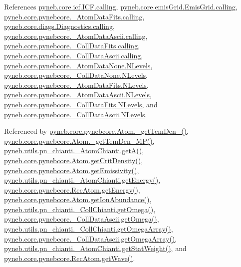 References \hyperlink{icf_8py_source_l00016}{pyneb.\+core.\+icf.\+I\+C\+F.\+calling}, \hyperlink{emis_grid_8py_source_l00041}{pyneb.\+core.\+emis\+Grid.\+Emis\+Grid.\+calling}, \hyperlink{pynebcore_8py_source_l00090}{pyneb.\+core.\+pynebcore.\+\_\+\+Atom\+Data\+Fits.\+calling}, \hyperlink{diags_8py_source_l00169}{pyneb.\+core.\+diags.\+Diagnostics.\+calling}, \hyperlink{pynebcore_8py_source_l00311}{pyneb.\+core.\+pynebcore.\+\_\+\+Atom\+Data\+Ascii.\+calling}, \hyperlink{pynebcore_8py_source_l00568}{pyneb.\+core.\+pynebcore.\+\_\+\+Coll\+Data\+Fits.\+calling}, \hyperlink{pynebcore_8py_source_l00918}{pyneb.\+core.\+pynebcore.\+\_\+\+Coll\+Data\+Ascii.\+calling}, \hyperlink{pynebcore_8py_source_l00062}{pyneb.\+core.\+pynebcore.\+\_\+\+Atom\+Data\+None.\+N\+Levels}, \hyperlink{pynebcore_8py_source_l00075}{pyneb.\+core.\+pynebcore.\+\_\+\+Coll\+Data\+None.\+N\+Levels}, \hyperlink{pynebcore_8py_source_l00155}{pyneb.\+core.\+pynebcore.\+\_\+\+Atom\+Data\+Fits.\+N\+Levels}, \hyperlink{pynebcore_8py_source_l00404}{pyneb.\+core.\+pynebcore.\+\_\+\+Atom\+Data\+Ascii.\+N\+Levels}, \hyperlink{pynebcore_8py_source_l00637}{pyneb.\+core.\+pynebcore.\+\_\+\+Coll\+Data\+Fits.\+N\+Levels}, and \hyperlink{pynebcore_8py_source_l00984}{pyneb.\+core.\+pynebcore.\+\_\+\+Coll\+Data\+Ascii.\+N\+Levels}.



Referenced by \hyperlink{pynebcore_8py_source_l01803}{pyneb.\+core.\+pynebcore.\+Atom.\+\_\+get\+Tem\+Den\+\_()}, \hyperlink{pynebcore_8py_source_l01980}{pyneb.\+core.\+pynebcore.\+Atom.\+\_\+get\+Tem\+Den\+\_\+\+M\+P()}, \hyperlink{pn__chianti_8py_source_l00296}{pyneb.\+utils.\+pn\+\_\+chianti.\+\_\+\+Atom\+Chianti.\+get\+A()}, \hyperlink{pynebcore_8py_source_l01693}{pyneb.\+core.\+pynebcore.\+Atom.\+get\+Crit\+Density()}, \hyperlink{pynebcore_8py_source_l01716}{pyneb.\+core.\+pynebcore.\+Atom.\+get\+Emissivity()}, \hyperlink{pn__chianti_8py_source_l00346}{pyneb.\+utils.\+pn\+\_\+chianti.\+\_\+\+Atom\+Chianti.\+get\+Energy()}, \hyperlink{pynebcore_8py_source_l02811}{pyneb.\+core.\+pynebcore.\+Rec\+Atom.\+get\+Energy()}, \hyperlink{pynebcore_8py_source_l02110}{pyneb.\+core.\+pynebcore.\+Atom.\+get\+Ion\+Abundance()}, \hyperlink{pn__chianti_8py_source_l00484}{pyneb.\+utils.\+pn\+\_\+chianti.\+\_\+\+Coll\+Chianti.\+get\+Omega()}, \hyperlink{pynebcore_8py_source_l01063}{pyneb.\+core.\+pynebcore.\+\_\+\+Coll\+Data\+Ascii.\+get\+Omega()}, \hyperlink{pn__chianti_8py_source_l00461}{pyneb.\+utils.\+pn\+\_\+chianti.\+\_\+\+Coll\+Chianti.\+get\+Omega\+Array()}, \hyperlink{pynebcore_8py_source_l01039}{pyneb.\+core.\+pynebcore.\+\_\+\+Coll\+Data\+Ascii.\+get\+Omega\+Array()}, \hyperlink{pn__chianti_8py_source_l00323}{pyneb.\+utils.\+pn\+\_\+chianti.\+\_\+\+Atom\+Chianti.\+get\+Stat\+Weight()}, and \hyperlink{pynebcore_8py_source_l02623}{pyneb.\+core.\+pynebcore.\+Rec\+Atom.\+get\+Wave()}.



